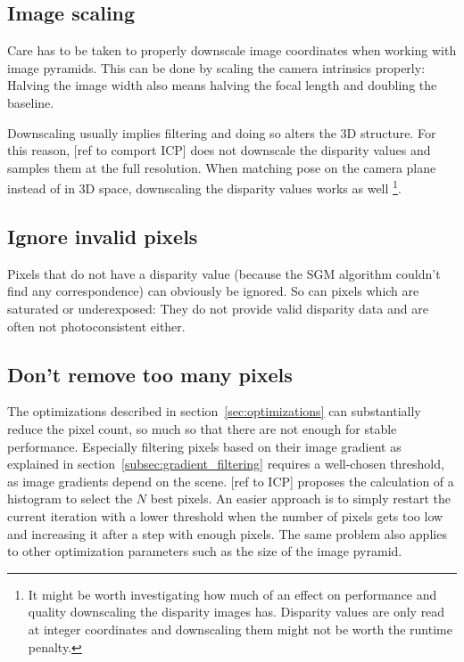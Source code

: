 \subsection{Image scaling}

Care has to be taken to properly downscale image coordinates when working with
image pyramids. This can be done by scaling the camera intrinsics properly:
Halving the image width also means halving the focal length and doubling the
baseline.

Downscaling usually implies filtering and doing so alters the 3D structure. For
this reason, [ref to comport ICP] does not downscale the disparity values and
samples them at the full resolution. When matching pose on the camera plane
instead of in 3D space, downscaling the disparity values works as well
\footnote{It might be worth investigating how much of an effect on performance
and quality downscaling the disparity images has. Disparity values are only
read at integer coordinates and downscaling them might not be worth the runtime
penalty.}.

\subsection{Ignore invalid pixels}

Pixels that do not have a disparity value (because the SGM algorithm couldn't
find any correspondence) can obviously be ignored. So can pixels which are
saturated or underexposed: They do not provide valid disparity data and are
often not photoconsistent either.

\subsection{Don't remove too many pixels}

The optimizations described in section~\ref{sec:optimizations} can
substantially reduce the pixel count, so much so that there are not enough for
stable performance. Especially filtering pixels based on their image gradient
as explained in section~\ref{subsec:gradient_filtering} requires a well-chosen
threshold, as image gradients depend on the scene. [ref to ICP] proposes the
calculation of a histogram to select the $N$ best pixels. An easier approach is
to simply restart the current iteration with a lower threshold when the number
of pixels gets too low and increasing it after a step with enough pixels. The
same problem also applies to other optimization parameters such as the size of
the image pyramid.
